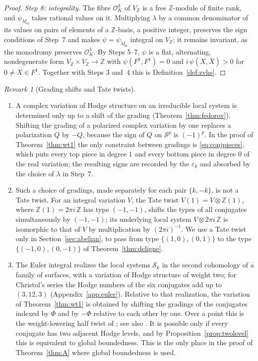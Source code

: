\documentclass[11pt]{amsart}
\theoremstyle{definition}
\theoremstyle{remark}
\newtheorem{remark}[theorem]{Remark}
\numberwithin{equation}{section}
\newcommand{\Z}{\mathbb{Z}}
\newcommand{\cS}{\mathcal{S}}
\newcommand{\cO}{\mathcal{O}}
\begin{document}
\begin{proof}
\emph{Step 8: integrality.} The fibre $\cO_K^3$ of $V_\Z$ is a free $\Z$-module of finite rank, and $\psi_{\lambda\xi_0}$ takes rational values on it. Multiplying $\lambda$ by a common denominator of its values on pairs of elements of a $\Z$-basis, a positive integer, preserves the sign conditions of Step~7 and makes $\psi=\psi_{\lambda\xi_0}$ integral on $V_\Z$; it remains invariant, as the monodromy preserves $\cO_K^3$. By Steps 5--7, $\psi$ is a flat, alternating, nondegenerate form $V_\Z\times V_\Z\to\Z$ with $\psi(F^1,F^1)=0$ and $i\,\psi(X,\overline X)>0$ for $0\ne X\in F^1$. Together with Steps 3 and~4 this is Definition~\ref{def:zvhs}.
\end{proof}

\begin{remark}[Grading shifts and Tate twists]\label{rem:halftwist}
\begin{enumerate}[label=(\arabic*),leftmargin=2em]
\item A complex variation of Hodge structure on an irreducible local system is determined only up to a shift of the grading (Theorem~\ref{thm:fedorov}). Shifting the grading of a polarized complex variation by one replaces a polarization $Q$ by $-Q$, because the sign of $Q$ on $\cS^p$ is $(-1)^p$. In the proof of Theorem~\ref{thm:wt1} the only constraint between gradings is \eqref{eq:conjpieces}, which puts every top piece in degree $1$ and every bottom piece in degree $0$ of the real variation; the resulting signs are recorded by the $\varepsilon_k$ and absorbed by the choice of $\lambda$ in Step~7.
\item Such a choice of gradings, made separately for each pair $\{k,-k\}$, is not a Tate twist. For an integral variation $V$, the Tate twist $V(1)=V\otimes\Z(1)$, where $\Z(1)=2\pi i\,\Z$ has type $(-1,-1)$, shifts the types of all conjugates simultaneously by $(-1,-1)$; its underlying local system $V\otimes2\pi i\,\Z$ is isomorphic to that of $V$ by multiplication by $(2\pi i)^{-1}$. We use a Tate twist only in Section~\ref{sec:abelian}, to pass from type $\{(1,0),(0,1)\}$ to the type $\{(-1,0),(0,-1)\}$ of Theorem~\ref{thm:deligne}.
\item The Euler integral realizes the local systems $\cS_k$ in the second cohomology of a family of surfaces, with a variation of Hodge structure of weight two; for Christol's series the Hodge numbers of the six conjugates add up to $(3,12,3)$ (Appendix~\ref{app:euler}). Relative to that realization, the variation of Theorem~\ref{thm:wt1} is obtained by shifting the gradings of the conjugates indexed by $\Phi$ and by $-\Phi$ relative to each other by one. Over a point this is the weight-lowering half twist of \citet{vanGeemen2001}; see also \citet{vanGeemenIzadi2002}. It is possible only if every conjugate has two adjacent Hodge levels, and by Proposition~\ref{prop:twolevel} this is equivalent to global boundedness. This is the only place in the proof of Theorem~\ref{thm:A} where global boundedness is used.
\end{enumerate}
\end{remark}
\end{document}
